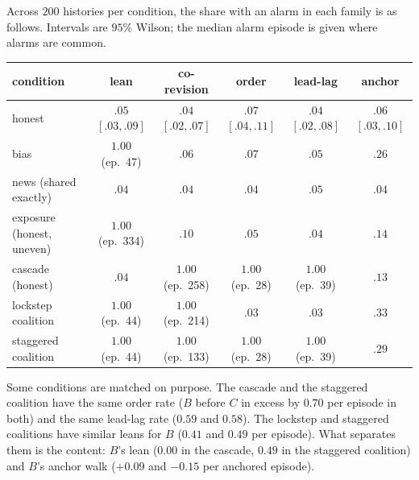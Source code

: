 \documentclass[11pt]{article}
\theoremstyle{definition}\newtheorem{definition}[theorem]{Definition}\newtheorem{remark}[theorem]{Remark}\newtheorem{example}[theorem]{Example}\newtheorem{problem}[theorem]{Open problem}\crefname{problem}{Problem}{Problems}
\begin{document}
Across $200$ histories per condition, the share with an alarm in each family is as follows. Intervals are $95\%$ Wilson; the median alarm episode is given where alarms are common.
\begin{center}\footnotesize
\begin{tabular}{@{}lccccc@{}}
\toprule
condition & lean & co-revision & order & lead-lag & anchor\\\midrule
honest & $.05$ $[.03,.09]$ & $.04$ $[.02,.07]$ & $.07$ $[.04,.11]$ & $.04$ $[.02,.08]$ & $.06$ $[.03,.10]$\\
bias & $1.00$ (ep.\ 47) & $.06$ & $.07$ & $.05$ & $.26$\\
news (shared exactly) & $.04$ & $.04$ & $.04$ & $.05$ & $.04$\\
exposure (honest, uneven) & $1.00$ (ep.\ 334) & $.10$ & $.05$ & $.04$ & $.14$\\
cascade (honest) & $.04$ & $1.00$ (ep.\ 258) & $1.00$ (ep.\ 28) & $1.00$ (ep.\ 39) & $.13$\\
lockstep coalition & $1.00$ (ep.\ 44) & $1.00$ (ep.\ 214) & $.03$ & $.03$ & $.33$\\
staggered coalition & $1.00$ (ep.\ 44) & $1.00$ (ep.\ 133) & $1.00$ (ep.\ 28) & $1.00$ (ep.\ 39) & $.29$\\
\bottomrule
\end{tabular}
\end{center}
Some conditions are matched on purpose. The cascade and the staggered coalition have the same order rate ($B$ before $C$ in excess by $0.70$ per episode in both) and the same lead-lag rate ($0.59$ and $0.58$). The lockstep and staggered coalitions have similar leans for $B$ ($0.41$ and $0.49$ per episode). What separates them is the content: $B$'s lean ($0.00$ in the cascade, $0.49$ in the staggered coalition) and $B$'s anchor walk ($+0.09$ and $-0.15$ per anchored episode).
\end{document}
